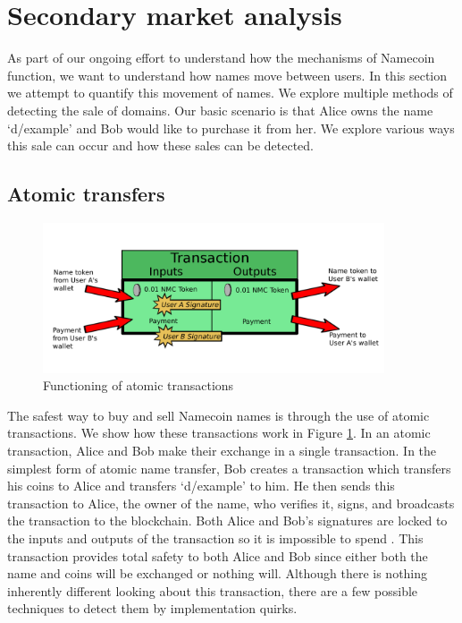 \section{Secondary market analysis}
\label{sec:methods}
As part of our ongoing effort to understand how the mechanisms of Namecoin function, we want to understand how names move between users. In this section we attempt to quantify this movement of names. We explore multiple methods of detecting the sale of domains. Our basic scenario is that Alice owns the name `d/example' and Bob would like to purchase it from her. We explore various ways this sale can occur and how these sales can be detected.

\subsection{Atomic transfers}

\begin{figure}
  \centering
  \includegraphics[width=0.9\textwidth]{figures/atomicTX}
  \caption{Functioning of atomic transactions}
  \label{fig:atomic}
\end{figure}

The safest way to buy and sell Namecoin names is through the use of atomic transactions. We show how these transactions work in Figure \ref{fig:atomic}. In an atomic transaction, Alice and Bob make their exchange in a single transaction. In the simplest form of atomic name transfer, Bob creates a transaction which transfers his coins to Alice and transfers `d/example' to him. He then sends this transaction to Alice, the owner of the name, who verifies it, signs, and broadcasts the transaction to the blockchain. Both Alice and Bob's signatures are locked to the inputs and outputs of the transaction so it is impossible to spend . This transaction provides total safety to both Alice and Bob since either both the name and coins will be exchanged or nothing will. Although there is nothing inherently different looking about this transaction, there are a few possible techniques to detect them by implementation quirks.

